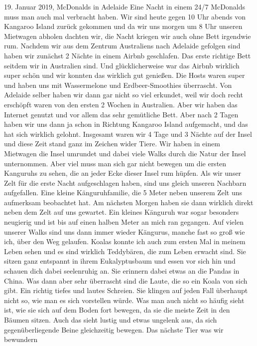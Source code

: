 \documentclass[11pt]{book}
\begin{document}
19. Januar 2019, McDonalds in Adelaide
Eine Nacht in einem 24/7 McDonalds muss man auch mal verbracht haben. Wir sind heute gegen 10 Uhr abends von Kangaroo Island 
zurück gekommen und da wir uns morgen um 8 Uhr unseren Mietwagen abholen dachten wir, die Nacht kriegen wir auch ohne Bett irgendwie 
rum. 
Nachdem wir aus dem Zentrum Australiens nach Adelaide gefolgen sind haben wir zunächst 2 Nächte in einem Airbnb geschlafen. 
Das erste richtige Bett seitdem wir in Australien sind. Und glücklicherweise war das Airbnb wirklich super schön und wir konnten 
das wirklich gut genießen. Die Hosts waren super und haben uns mit Wassermelone und Erdbeer-Smoothies überrascht. Von Adelaide 
selber haben wir dann gar nicht so viel erkundet, weil wir doch recht erschöpft waren von den ersten 2 Wochen in Australien. 
Aber wir haben das Internet genutzt und vor allem das sehr gemütliche Bett. Aber nach 2 Tagen haben wir uns dann ja schon in 
Richtung Kangaroo Island aufgemacht, und das hat sich wirklich gelohnt. Insgesamt waren wir 4 Tage und 3 Nächte auf der Insel 
und diese Zeit stand ganz im Zeichen wider Tiere. Wir haben in einem Mietwagen die Insel umrundet und dabei viele Walks durch die
Natur der Insel unternommen. Aber viel muss man sich gar nicht bewegen um die ersten Kanguruhs zu sehen, die an jeder Ecke dieser 
Insel rum hüpfen. Als wir unser Zelt für die erste Nacht aufgeschlagen haben, sind uns gleich unseren Nachbarn aufgefallen. Eine 
kleine Känguruhfamilie, die 5 Meter neben unserem Zelt uns aufmerksam beobachtet hat. Am nächsten Morgen haben sie dann wirklich 
direkt neben dem Zelt auf uns gewartet. Ein kleines Känguruh war sogar besonders neugierig und ist bis auf einen halben Meter 
an mich ran gegangen. Auf vielen unserer Walks sind uns dann immer wieder Kängurus, manche fast so groß wie ich, über den Weg 
gelaufen. Koalas konnte ich auch zum ersten Mal in meinem Leben sehen und es sind wirklich Teddybären, die zum Leben 
erwacht sind. Sie sitzen ganz entspannt in ihrem Eukalyptusbaum und essen vor sich hin und schauen dich dabei seelenruhig an. Sie 
erinnern dabei etwas an die Pandas in China. Was dann aber sehr überrascht sind die Laute, die so ein Koala von sich gibt. Ein 
richtig tiefes und lautes Schreien. Sie klingen auf jeden Fall überhaupt nicht so, wie man es sich vorstellen würde. Was man 
auch nicht so häufig sieht ist, wie sie sich auf dem Boden fort bewegen, da sie die meiste Zeit in den Bäumen sitzen. Auch das 
sieht lustig und etwas ungelenk aus, da sich gegenüberliegende Beine gleichzeitig bewegen. Das nächste Tier was wir bewundern 
\end{document}
